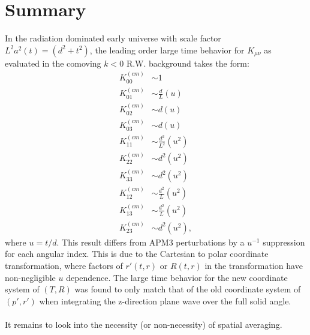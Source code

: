 \documentclass[10pt,letterpaper]{article}
\begin{document}
\section*{Summary}
In the radiation dominated early universe with scale factor $L^2 a^2(t) =(d^2+t^2)$, the leading order large time behavior for $K_{\mu\nu}$ as evaluated in the comoving $k<0$ R.W. background takes the form:
\begin{align}
K^{(cm)}_{00} &\sim 1 \nonumber\\
K^{(cm)}_{01} &\sim \frac{d}{L}(u) \nonumber\\
K^{(cm)}_{02} &\sim d(u) \nonumber\\
K^{(cm)}_{03} &\sim d(u) \nonumber\\
K^{(cm)}_{11} &\sim \frac{d^2}{L^2}(u^2) \nonumber\\
K^{(cm)}_{22} &\sim d^2(u^2) \nonumber\\
K^{(cm)}_{33} &\sim d^2(u^2) \nonumber\\
K^{(cm)}_{12} &\sim \frac{d^2}{L}(u^2) \nonumber\\
K^{(cm)}_{13} &\sim \frac{d^2}{L}(u^2) \nonumber\\
K^{(cm)}_{23} &\sim d^2(u^2),
\end{align}
where $u = t/d$. This result differs from APM3 perturbations by a $u^{-1}$ suppression for each angular index. This is due to the Cartesian to polar coordinate transformation, where factors of $r'(t,r)$ or $R(t,r)$ in the transformation have non-negligible $u$ dependence. The large time behavior for the new coordinate system of $(T,R)$ was found to only match that of the old coordinate system of $(p',r')$ when integrating the z-direction plane wave over the full solid angle. 
\\ \\
It remains to look into the necessity (or non-necessity) of spatial averaging. 
\end{document}
